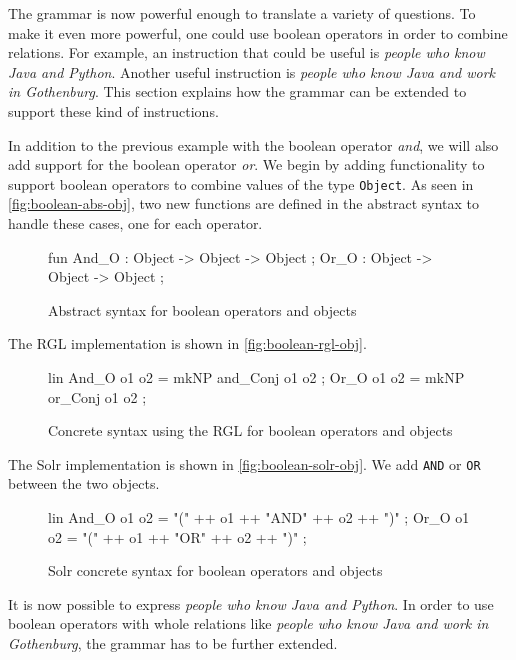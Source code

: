 The grammar is now powerful enough to translate a variety of questions. To make it even more powerful, one could use boolean operators in order to combine relations. For example, an instruction that could be useful is \emph{people who know Java and Python}. Another useful instruction is \emph{people who know Java and work in Gothenburg}. This section explains how the grammar can be extended to support these kind of instructions.

In addition to the previous example with the boolean operator \emph{and}, we will also add support for the boolean operator \emph{or}. We begin by adding functionality to support boolean operators to combine values of the type \texttt{Object}. As seen in \autoref{fig:boolean-abs-obj}, two new functions are defined in the abstract syntax to handle these cases, one for each operator.

\begin{figure}[H]
\begin{code}
fun
  And_O : Object -> Object -> Object ;
  Or_O : Object -> Object -> Object ;
\end{code}
\caption{Abstract syntax for boolean operators and objects\label{fig:boolean-abs-obj}}
\end{figure}

The RGL implementation is shown in \autoref{fig:boolean-rgl-obj}.

\begin{figure}[H]
\begin{code}
lin
  And_O o1 o2 = mkNP and_Conj o1 o2 ;
  Or_O o1 o2 = mkNP or_Conj o1 o2 ;
\end{code}
\caption{Concrete syntax using the RGL for boolean operators and objects\label{fig:boolean-rgl-obj}}
\end{figure}

The Solr implementation is shown in \autoref{fig:boolean-solr-obj}. We add \texttt{AND} or \texttt{OR} between the two objects.

\begin{figure}[H]
\begin{code}
lin
  And_O o1 o2 = "(" ++ o1 ++ "AND" ++ o2 ++ ")" ;
  Or_O o1 o2 = "(" ++ o1 ++ "OR" ++ o2 ++ ")" ;
\end{code}
\caption{Solr concrete syntax for boolean operators and objects\label{fig:boolean-solr-obj}}
\end{figure}

It is now possible to express \emph{people who know Java and Python}. In order to use boolean operators with whole relations like \emph{people who know Java and work in Gothenburg}, the grammar has to be further extended.

